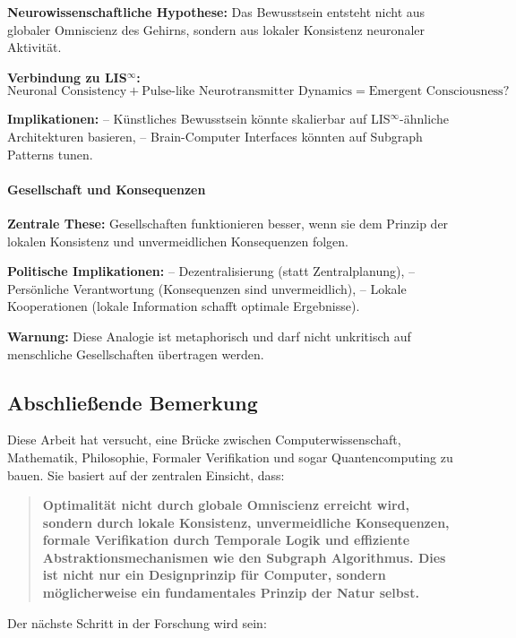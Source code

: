 \documentclass[a4paper,12pt]{article}
\theoremstyle{definition}
\begin{document}
\textbf{Neurowissenschaftliche Hypothese:} Das Bewusstsein entsteht nicht aus globaler Omniscienz des Gehirns, sondern aus lokaler Konsistenz neuronaler Aktivität.

\textbf{Verbindung zu LIS$^{\infty}$:}
\[
\text{Neuronal Consistency} + \text{Pulse-like Neurotransmitter Dynamics} = \text{Emergent Consciousness}?
\]

\textbf{Implikationen:}
-- Künstliches Bewusstsein könnte skalierbar auf LIS$^{\infty}$-ähnliche Architekturen basieren,
-- Brain-Computer Interfaces könnten auf Subgraph Patterns tunen.

\paragraph{Gesellschaft und Konsequenzen}

\textbf{Zentrale These:} Gesellschaften funktionieren besser, wenn sie dem Prinzip der lokalen Konsistenz und unvermeidlichen Konsequenzen folgen.

\textbf{Politische Implikationen:}
-- Dezentralisierung (statt Zentralplanung),
-- Persönliche Verantwortung (Konsequenzen sind unvermeidlich),
-- Lokale Kooperationen (lokale Information schafft optimale Ergebnisse).

\textbf{Warnung:} Diese Analogie ist metaphorisch und darf nicht unkritisch auf menschliche Gesellschaften übertragen werden.

\subsection{Abschließende Bemerkung}

Diese Arbeit hat versucht, eine Brücke zwischen Computerwissenschaft, Mathematik, Philosophie, Formaler Verifikation und sogar Quantencomputing zu bauen. Sie basiert auf der zentralen Einsicht, dass:

\begin{quote}
	\textbf{Optimalität nicht durch globale Omniscienz erreicht wird, sondern durch lokale Konsistenz, unvermeidliche Konsequenzen, formale Verifikation durch Temporale Logik und effiziente Abstraktionsmechanismen wie den Subgraph Algorithmus. Dies ist nicht nur ein Designprinzip für Computer, sondern möglicherweise ein fundamentales Prinzip der Natur selbst.}
\end{quote}

Der nächste Schritt in der Forschung wird sein:
\end{document}
